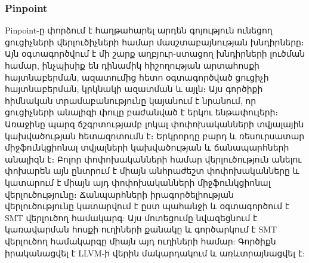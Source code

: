 \subsubsection{Pinpoint}
Pinpoint\cite{Qingkai2018}-ը փորձում է հաղթահարել արդեն գոյություն ունեցող ցուցիչների վերլուծիչների համար մասշտաբայնության
խնդիրները։
Այն օգտագործվում է մի շարք աղբյուր-ստացող խնդիրների լուծման համար, ինչպիսիք են դինամիկ հիշողության արտահոսքի հայտնաբերման,
ազատումից հետո օգտագործված ցուցիչի հայտնաբերման, կրկնակի ազատման և այլն։ Այս գործիքի հիմնական տրամաբանությունը կայանում է
նրանում, որ ցուցիչների անալիզի փուլը բաժանված է երկու ենթափուլերի։ Առաջինը պարզ ճշգրտությամբ լոկալ փոփոխականների տվյալային
կախվածության հետազոտումն է։ Երկրորդը բարդ և ռեսուրսատար միջֆունկցիոնալ տվյալների կախվածության և ճանապարհների անալիզն է։
Բոլոր փոփոխականների համար վերլուծություն անելու փոխարեն այն ընտրում է միայն անհրաժեշտ փոփոխականները և կատարում է միայն
այդ փոփոխականների միջֆունկցիոնալ վերլուծությունը։ Ճանպարհների իրագործելիության վերլուծությունը կատարվում է ըստ պահանջի
և օգտագործում է SMT վերլուծող համակարգ: Այս մոտեցումը նվազեցնում է կառավարման հոսքի ուղիների քանակը և գործարկում է SMT
վերլուծող համակարգը միայն այդ ուղիների համար: Գործիքն իրականացվել է LLVM-ի վերին մակարդակում և առևտրայնացվել է\cite{Pinpoint}:
